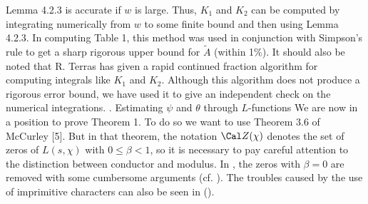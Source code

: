Lemma 4.2.3 is accurate if  $w$  is large.  Thus,  $K_1$  and 
$K_2$  can be computed by integrating numerically from  $w$  to some
finite bound and then using Lemma 4.2.3.  In computing Table 1, this
method was used in conjunction with Simpson's rule to get a sharp
rigorous upper bound for  $\tilde{A}$  (within 1\%).  It should also
be noted that R. Terras \cite{13} has given a rapid continued
fraction algorithm for computing integrals like  $K_1$ and $K_2$. 
Although this algorithm does not produce a rigorous error bound, we
have used it to give an independent check on the numerical
integrations.
. Estimating $\psi$ and $\theta$ through
$L$-functions\endsubhead
We are now in a position to prove Theorem 1. To do so we want to use
Theorem 3.6 of McCurley [5]. But in that theorem, the notation $\Cal
Z(\chi)$ denotes the set of zeros of
$L(s,\chi)$ with $0\le\beta<1$, so it is necessary to pay careful
attention to the distinction between conductor and modulus. In
\cite{5}, the zeros with $\beta=0$ are removed with some cumbersome
arguments (cf. \cite{5, (3.25), (3.26), (3.27) and (3.38)}). The
troubles caused by the use of imprimitive characters can also be
seen in (\cite{5, (3.15)}).


